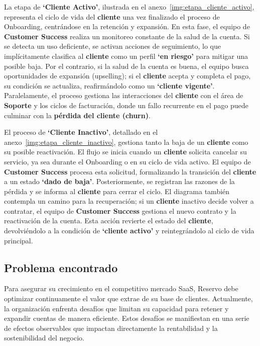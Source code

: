 La etapa de \textbf{`Cliente Activo'}, ilustrada en el anexo~\ref{img:etapa_cliente_activo}, representa el ciclo de vida del \textbf{cliente} una vez finalizado el proceso de Onboarding, centrándose en la retención y expansión. En esta fase, el equipo de \textbf{Customer Success} realiza un monitoreo constante de la salud de la cuenta. Si se detecta un uso deficiente, se activan acciones de seguimiento, lo que implícitamente clasifica al \textbf{cliente} como un perfil \textbf{`en riesgo'} para mitigar una posible baja. Por el contrario, si la salud de la cuenta es buena, el equipo busca oportunidades de expansión (upselling); si el \textbf{cliente} acepta y completa el pago, su condición se actualiza, reafirmándolo como un \textbf{`cliente vigente'}. Paralelamente, el proceso gestiona las interacciones del \textbf{cliente} con el área de \textbf{Soporte} y los ciclos de facturación, donde un fallo recurrente en el pago puede culminar con la \textbf{pérdida del cliente (churn)}.

El proceso de \textbf{`Cliente Inactivo'}, detallado en el anexo~\ref{img:etapa_cliente_inactivo}, gestiona tanto la baja de un \textbf{cliente} como su posible reactivación. El flujo se inicia cuando un \textbf{cliente} solicita cancelar su servicio, ya sea durante el Onboarding o en su ciclo de vida activo. El equipo de \textbf{Customer Success} procesa esta solicitud, formalizando la transición del \textbf{cliente} a un estado \textbf{`dado de baja'}. Posteriormente, se registran las razones de la pérdida y se informa al \textbf{cliente} para cerrar el ciclo. El diagrama también contempla un camino para la recuperación; si un \textbf{cliente} inactivo decide volver a contratar, el equipo de \textbf{Customer Success} gestiona el nuevo contrato y la reactivación de la cuenta. Esta acción revierte el estado del \textbf{cliente}, devolviéndolo a la condición de \textbf{`cliente activo'} y reintegrándolo al ciclo de vida principal.

\subsection{Problema encontrado}
Para asegurar su crecimiento en el competitivo mercado SaaS, Reservo debe optimizar continuamente el valor que extrae de su base de clientes. Actualmente, la organización enfrenta desafíos que limitan su capacidad para retener y expandir cuentas de manera eficiente. Estos desafíos se manifiestan en una serie de efectos observables que impactan directamente la rentabilidad y la sostenibilidad del negocio.

